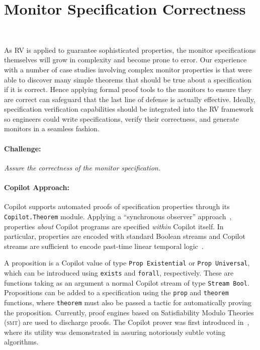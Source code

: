 \section{Monitor Specification Correctness}~\label{sec:verispec}

As RV is applied to  guarantee sophisticated properties, the
monitor specifications themselves will grow in complexity and become
prone to error.  Our experience with a number of case studies
involving complex monitor properties is that were able to discover
many simple theorems that should be true about a specification if it
is correct. Hence applying formal proof tools to the monitors to
ensure they are correct can safeguard that the last line of
defense is actually effective. Ideally, specification verification
capabilities should be integrated into the RV framework so engineers
could write specifications, verify their correctness, and generate
monitors in a seamless fashion.

\paragraph{Challenge:}  \emph{Assure  the correctness of the monitor
specification.}   

\paragraph{Copilot Approach:}  
 Copilot supports automated proofs of specification
 properties  through its {\tt Copilot.Theorem} module.  Applying a 
``synchronous observer'' approach~\cite{amast93}, properties \emph{about}
Copilot programs are specified \emph{within} Copilot itself. In particular,
properties are encoded with standard Boolean streams and Copilot streams are
sufficient to encode past-time linear temporal logic~\cite{ptltl}.

 A proposition is a Copilot value of type \texttt{Prop Existential}
 or \texttt{Prop Universal}, which can be introduced using \texttt{exists} and
\texttt{forall}, respectively. These are functions taking as an argument a
normal Copilot stream of type \lstinline{Stream Bool}. Propositions can be added
to a specification using the \texttt{prop} and \texttt{theorem} functions,
where \texttt{theorem} must also be passed a tactic for automatically proving
the proposition. Currently, proof engines  based on
Satisfiability Modulo Theories (\textsc{smt})   are used to discharge
proofs.  The Copilot prover was first introduced
in~\cite{pike-rv-15}, where its utility was demonstrated in assuring
notoriously subtle voting algorithms.

